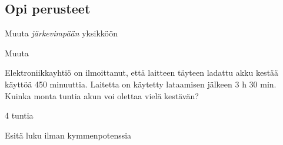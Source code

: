 
\begin{tehtavasivu}

\subsection*{Opi perusteet}

\begin{tehtava}
Muuta \emph{järkevimpään} yksikköön
\begin{alakohdat}
\end{alakohdat}
\begin{vastaus}
\begin{alakohdat}
\end{alakohdat}
\end{vastaus}
\end{tehtava}

\begin{tehtava}
Muuta
      \begin{alakohdat}
      \end{alakohdat}
  \begin{vastaus}
    \begin{alakohdat}
      \end{alakohdat}
  \end{vastaus}
\end{tehtava}

\begin{tehtava}
Elektroniikkayhtiö on ilmoittanut, että laitteen täyteen ladattu akku kestää käyttöä 450 minuuttia. Laitetta on käytetty lataamisen jälkeen 3 h 30 min. Kuinka monta tuntia akun voi olettaa vielä kestävän?
\begin{vastaus}
4 tuntia
\end{vastaus}
\end{tehtava}

\begin{tehtava}
Esitä luku ilman kymmenpotenssia
\begin{alakohdat}
\end{alakohdat}
\begin{vastaus}
\begin{alakohdat}
\end{alakohdat}
\end{vastaus}
\end{tehtava}



\end{tehtavasivu}
